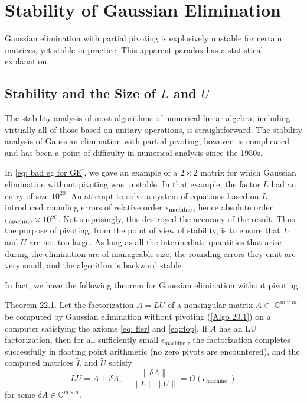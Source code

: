 \chapter{Stability of Gaussian Elimination}
Gaussian elimination with partial pivoting is explosively unstable for certain matrices, yet stable in practice. This apparent paradox has a statistical explanation. 

\section{Stability and the Size of $L$ and $U$}
The stability analysis of most algorithms of numerical linear algebra, including virtually all of those based on unitary operations, is straightforward. The stability analysis of Gaussian elimination with partial pivoting, however, is complicated and has been a point of difficulty in numerical analysis since the 1950s. 

In \eqref{eq: bad eg for GE}, we gave an example of a $ 2\times 2 $ matrix for which Gaussian elimination without pivoting was unstable. In that example, the factor $L$ had an entry of size $10^{20}$. An attempt to solve a system of equations based on $L$ introduced rounding errors of relative order $ \epsilon_{\text{machine}} $, hence absolute order $ \epsilon_{\text{machine}} \times 10^{20} $. Not surprisingly, this destroyed the accuracy of the result. 
Thus the purpose of pivoting, from the point of view of stability, is to ensure that $L$ and $U$ are not too large. As long as all the intermediate quantities that arise during the elimination are of manageable size, the rounding errors they emit are very small, and the algorithm is backward stable. 

In fact, we have the following theorem for Gaussian elimination without pivoting. 


\begin{theorem}
\label{thm: bound GE}
Theorem 22.1. Let the factorization $A=L U$ of a nonsingular matrix $A \in$ $\mathbb{C}^{m \times m}$ be computed by Gaussian elimination without pivoting (\autoref{Algo 20.1}) on a computer satisfying the axioms \eqref{eq: fler} and \eqref{eq:flop}. If $A$ has an LU factorization, then for all sufficiently small $\epsilon_{\text {machine }}$, the factorization completes successfully in floating point arithmetic (no zero pivots are encountered), and the computed matrices $\tilde{L}$ and $\tilde{U}$ satisfy
\begin{equation}
\label{eq: bound GE}
\tilde{L} \tilde{U}=A+\delta A, \quad \frac{\|\delta A\|}{\|L\|\|U\|}=O\left(\epsilon_{\text {machine }}\right)   
\end{equation}
for some $\delta A \in \mathbb{C}^{m \times n}$.
\end{theorem}

